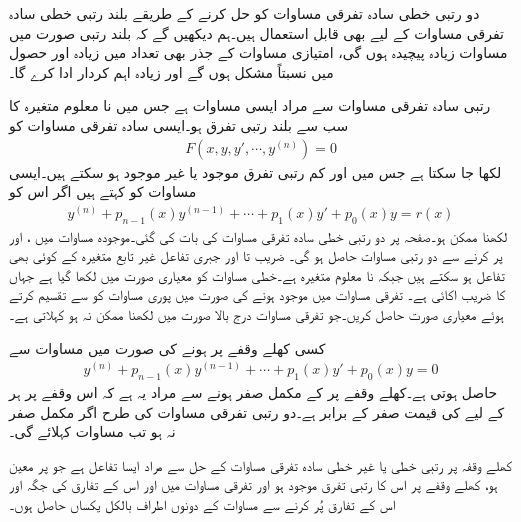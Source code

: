 دو رتبی خطی سادہ تفرقی مساوات کو حل کرنے کے طریقے بلند رتبی خطی سادہ تفرقی مساوات کے لیے بھی قابل استعمال ہیں۔ہم دیکھیں گے کہ بلند رتبی صورت میں مساوات زیادہ پیچیدہ ہوں گی،  امتیازی مساوات کے جذر بھی تعداد میں زیادہ اور حصول میں نسبتاً مشکل ہوں گے اور  زیادہ اہم کردار ادا کرے گا۔ 

 رتبی سادہ تفرقی مساوات سے مراد ایسی مساوات ہے جس میں نا معلوم متغیرہ  کا  سب سے بلند رتبی تفرق ہو۔ایسی سادہ تفرقی مساوات کو
\begin{align*}
F(x,y,y',\cdots, y^{(n)})=0
\end{align*}
لکھا جا سکتا ہے جس میں  اور کم رتبی تفرق موجود یا غیر موجود ہو سکتے ہیں۔ایسی مساوات کو  کہتے ہیں اگر اس کو 
\begin{align}\label{مساوات_سادہ_بلند_خطی_الف}
y^{(n)}+p_{n-1}(x)y^{(n-1)}+\cdots+p_1(x)y'+p_0(x)y=r(x)
\end{align}
لکھنا ممکن ہو۔صفحہ  پر دو رتبی خطی سادہ تفرقی مساوات کی بات کی گئی۔موجودہ مساوات میں ،  اور  پر کرنے سے دو رتبی مساوات حاصل ہو گی۔ ضریب   تا   اور جبری تفاعل  غیر تابع متغیرہ   کے کوئی بھی تفاعل ہو سکتے ہیں جبکہ  نا معلوم متغیرہ ہے۔خطی مساوات کو معیاری صورت میں لکھا گیا ہے جہاں  کا  ضریب  اکائی  ہے۔ تفرقی مساوات میں   موجود ہونے کی صورت میں پوری مساوات کو  سے تقسیم کرتے ہوئے معیاری صورت حاصل کریں۔جو تفرقی مساوات درج بالا صورت میں لکھنا ممکن نہ ہو  کہلاتی ہے۔

کسی کھلے وقفے  پر    ہونے کی صورت میں  مساوات  سے 
\begin{align}\label{مساوات_سادہ_بلند_خطی_ب}
y^{(n)}+p_{n-1}(x)y^{(n-1)}+\cdots+p_1(x)y'+p_0(x)y=0
\end{align}
حاصل ہوتی ہے۔کھلے وقفے پر  کے مکمل صفر ہونے سے مراد یہ ہے کہ اس وقفے پر ہر  کے لیے  کی قیمت صفر کے برابر ہے۔دو رتبی تفرقی مساوات کی طرح  اگر  مکمل صفر نہ ہو تب مساوات  کہلائے گی۔

کھلے وقفہ  پر  رتبی خطی یا غیر خطی سادہ تفرقی مساوات کے حل  سے مراد ایسا تفاعل ہے جو  پر معین ہو،  کھلے وقفے پر اس کا  رتبی تفرق موجود ہو اور تفرقی مساوات میں  اور اس کے تفارق کی جگہ  اور اس کے تفارق پُر کرنے سے مساوات کے دونوں اطراف بالکل یکساں حاصل ہوں۔ 

